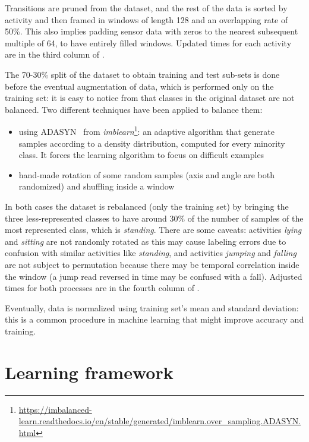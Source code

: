 Transitions are pruned from the dataset, and the rest of the data is sorted by activity and then framed in windows of length 128 and an overlapping rate of 50\%. This also implies padding sensor data with zeros to the nearest subsequent multiple of 64, to have entirely filled windows.
Updated times for each activity are in the third column of .

The 70-30\% split of the dataset to obtain training and test sub-sets is done before the eventual augmentation of data, which is performed only on the training set: it is easy to notice from  that classes in the original dataset are not balanced.
Two different techniques have been applied to balance them:
\begin{itemize}
    \item using ADASYN~\cite{He-ADASYN} from \textit{imblearn}\footnote{\url{https://imbalanced-learn.readthedocs.io/en/stable/generated/imblearn.over_sampling.ADASYN.html}}: an adaptive algorithm that generate samples according to a density distribution, computed for every minority class. It forces the learning algorithm to focus on difficult examples
    \item hand-made rotation of some random samples (axis and angle are both randomized) and shuffling inside a window
\end{itemize}
In both cases the dataset is rebalanced (only the training set) by bringing the three less-represented classes to have around 30\% of the number of samples of the most represented class, which is \textit{standing}.
There are some caveats: activities \textit{lying} and \textit{sitting} are not randomly rotated as this may cause labeling errors due to confusion with similar activities like \textit{standing}, and activities \textit{jumping} and \textit{falling} are not subject to permutation because there may be temporal correlation inside the window (a jump read reversed in time may be confused with a fall).
Adjusted times for both processes are in the fourth column of .

Eventually, data is normalized using training set's mean and standard deviation: this is a common procedure in machine learning that might improve accuracy and training.

\section{Learning framework}\label{sec:learning_framework}

